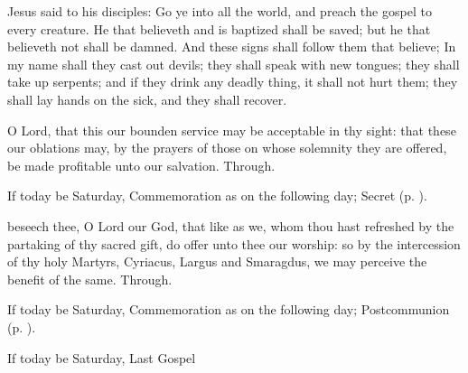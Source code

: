 
 Jesus said to his disciples: Go ye into all the world, and preach the gospel to every creature. He that believeth and is baptized shall be saved; but he that believeth not shall be damned. And these signs shall follow them that believe; In my name shall they cast out devils; they shall speak with new tongues; they shall take up serpents; and if they drink any deadly thing, it shall not hurt them; they shall lay hands on the sick, and they shall recover.


\secret
{} O Lord, that this our bounden service may be acceptable in thy sight: that these our oblations may, by the prayers of those on whose solemnity they are offered, be made profitable unto our salvation. Through.

\begin{rubric}
	If today be Saturday, Commemoration  as on the following day;  Secret  (p. \pageref{SPSaints}).
\end{rubric}


\postcommunion
{} beseech thee, O Lord our God, that like as we, whom thou hast refreshed by the partaking of thy sacred gift, do offer unto thee our worship: so by the intercession of thy holy Martyrs, Cyriacus, Largus and Smaragdus, we may perceive the benefit of the same. Through.

\begin{rubric}
	If today be Saturday, Commemoration  as on the following day;  Postcommunion  (p. \pageref{SPSaints}).
\end{rubric}

\begin{rubric}
	If today be Saturday, Last Gospel  
\end{rubric}


